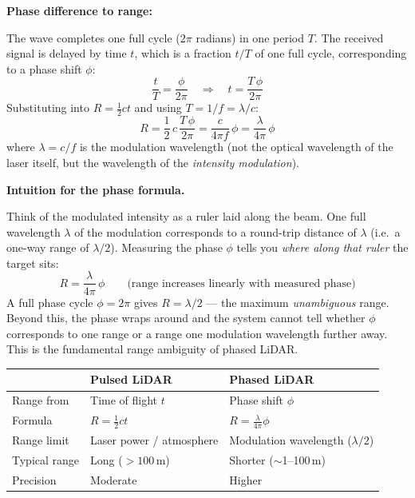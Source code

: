 \documentclass[12pt, a4paper]{article}
\begin{document}
\textbf{Phase difference to range:}

The wave completes one full cycle ($2\pi$ radians) in one period $T$.
The received signal is delayed by time $t$, which is a fraction $t/T$ of one
full cycle, corresponding to a phase shift $\phi$:
\[
  \frac{t}{T} = \frac{\phi}{2\pi}
  \quad\Longrightarrow\quad
  t = \frac{T\,\phi}{2\pi}
\]
Substituting into $R = \frac{1}{2}ct$ and using $T = 1/f = \lambda/c$:
\[
  R
  = \frac{1}{2}\,c\,\frac{T\,\phi}{2\pi}
  = \frac{c}{4\pi f}\,\phi
  = \frac{\lambda}{4\pi}\,\phi
\]
where $\lambda = c/f$ is the modulation wavelength (not the optical
wavelength of the laser itself, but the wavelength of the \emph{intensity
modulation}).

\begin{notebox}
  \textbf{Intuition for the phase formula.}

  Think of the modulated intensity as a ruler laid along the beam.  One full
  wavelength $\lambda$ of the modulation corresponds to a round-trip distance
  of $\lambda$ (i.e.\ a one-way range of $\lambda/2$).  Measuring the phase
  $\phi$ tells you \emph{where along that ruler} the target sits:
  \[
    R = \frac{\lambda}{4\pi}\,\phi
    \qquad
    \text{(range increases linearly with measured phase)}
  \]
  A full phase cycle $\phi = 2\pi$ gives $R = \lambda/2$ --- the maximum
  \emph{unambiguous} range.  Beyond this, the phase wraps around and the
  system cannot tell whether $\phi$ corresponds to one range or a range one
  modulation wavelength further away.  This is the fundamental range
  ambiguity of phased LiDAR.

  \begin{center}
    \begin{tabular}{@{}lll@{}}
      \toprule
      & \textbf{Pulsed LiDAR} & \textbf{Phased LiDAR} \\
      \midrule
      Range from    & Time of flight $t$              & Phase shift $\phi$ \\
      Formula       & $R = \tfrac{1}{2}ct$            & $R = \tfrac{\lambda}{4\pi}\phi$ \\
      Range limit   & Laser power / atmosphere        & Modulation wavelength ($\lambda/2$) \\
      Typical range & Long ($>100$\,m)                & Shorter ($\sim$1--100\,m) \\
      Precision     & Moderate                        & Higher \\
      \bottomrule
    \end{tabular}
  \end{center}


\end{notebox}
\end{document}
